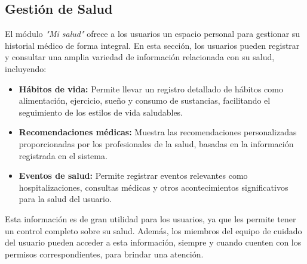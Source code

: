 \documentclass[a4paper,12pt]{article}
\begin{document}
    \subsection{Gestión de Salud}
    \par El módulo \textit{"Mi salud"} ofrece a los usuarios un espacio personal para gestionar su historial médico de forma integral. En esta sección, los usuarios pueden registrar y consultar una amplia variedad de información relacionada con su salud, incluyendo:
    \begin{itemize}
        \item \textbf{Hábitos de vida:} Permite llevar un registro detallado de hábitos como alimentación, ejercicio, sueño y consumo de sustancias, facilitando el seguimiento de los estilos de vida saludables.
        \item \textbf{Recomendaciones médicas:} Muestra las recomendaciones personalizadas proporcionadas por los profesionales de la salud, basadas en la información registrada en el sistema.
        \item \textbf{Eventos de salud:} Permite registrar eventos relevantes como hospitalizaciones, consultas médicas y otros acontecimientos significativos para la salud del usuario.
    \end{itemize}
    \par Esta información es de gran utilidad para los usuarios, ya que les permite tener un control completo sobre su salud. Además, los miembros del equipo de cuidado del usuario pueden acceder a esta información, siempre y cuando cuenten con los permisos correspondientes, para brindar una atención.
\end{document}
